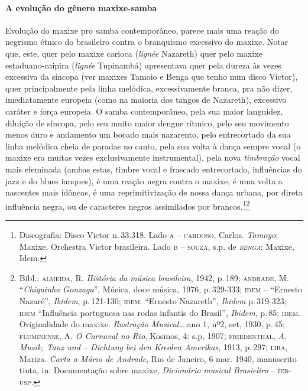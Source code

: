 \paragraph{A evolução do gênero maxixe-samba} Evolução do maxixe pro samba contemporâneo, parece mais uma reação do negrismo étnico do brasileiro contra o branquismo excessivo do maxixe.
Notar que, este, quer pelo maxixe carioca (\textit{lignée} Nazareth) quer
pelo maxixe estaduano-caipira (\textit{lignée} Tupinambá) apresentava quer
pela dureza às vezes excessiva da síncopa (ver maxixes Tamoio e Benga
que tenho num disco Victor), quer principalmente pela linha melódica,
excessivamente branca, pra não dizer, imediatamente europeia (como na
maioria dos tangos de Nazareth), excessivo caráter e força europeia. O
samba contemporâneo, pela sua maior languidez, diluição de síncopa, pelo
seu muito maior dengue rítmico, pelo seu movimento menos duro e
andamento um bocado mais nazarento, pelo entrecortado da sua linha
melódica cheia de paradas no canto, pela sua volta à dança sempre vocal
(o maxixe era muitas vezes exclusivamente instrumental), pela nova
\textit{timbração} vocal mais efeminada (ambas estas, timbre vocal e frascado
entrecortado, influências do jazz e do blues ianques), é uma reação negra
contra o maxixe, é uma volta a nascentes mais idôneas, é uma
reprimitivização de nossa dança urbana, por direta influência negra, ou
de caracteres negros assimilados por brancos.\footnote{Discografia: Disco Victor n.\,33.318. Lado \textsc{a} -- \textsc{cardoso}, Carlos.
\textit{Tamoyo}; Maxixe. Orchestra Victor brasileira. Lado \textsc{b} -- \textsc{souza},
s.p. de \textit{\textsc{benga}}: Maxixe, Idem.}\footnote{Bibl.: \textsc{almeida}, R. \textit{História da música brasileira}, 1942, p.\,189;
\textsc{andrade}, M. ``\textit{Chiquinha Gonzaga}'', Música, doce música, 1976,
p.\,329-333; \textsc{idem} -- ``Ernesto Nazaré'', \textit{Ibidem}, p.\,121-130; \textsc{idem}.
``Ernesto Nazareth'', \textit{Ibidem} p.\,319-323; \textsc{idem} ``Influência portuguesa
nas rodas infantis do Brasil'', \textit{Ibidem}, p.\,85; \textsc{idem}. Originalidade
do maxixe. \textit{Ilustração Musical\ldots{}} ano 1, nº2, set, 1930, p.\,45;
\textsc{fluminense}, A. \textit{O Carnaval no Rio}, Kosmos, 4: s.p, 1907;
\textsc{friedenthal}, \textit{A. Musik, Tanz und -- Dichtung bei den Kreolen
Amerikas}, 1913, p.\,297; \textsc{lira}, Mariza. \textit{Carta a Mário de Andrade},
Rio de Janeiro, 6 mar. 1940, manuscrito tinta, in: Documentação sobre
maxixe, \textit{Dicionário musical Brasieliro} -- \textsc{ieb-usp}.}

